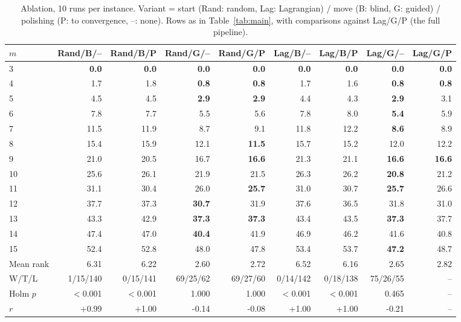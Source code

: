 \begin{table}[t]
\centering
\footnotesize
\setlength{\tabcolsep}{3pt}
\caption{Ablation, 10 runs per instance. Variant = start (Rand: random, Lag: Lagrangian) / move (B: blind, G: guided) / polishing (P: to convergence, --: none). Rows as in Table~\ref{tab:main}, with comparisons against Lag/G/P (the full pipeline).}\label{tab:ablation}
\begin{tabular}{lrrrrrrrr}
\toprule
$m$ & Rand/B/-- & Rand/B/P & Rand/G/-- & Rand/G/P & Lag/B/-- & Lag/B/P & Lag/G/-- & Lag/G/P \\
\midrule
3 & \textbf{0.0} & \textbf{0.0} & \textbf{0.0} & \textbf{0.0} & \textbf{0.0} & \textbf{0.0} & \textbf{0.0} & \textbf{0.0} \\
4 & 1.7 & 1.8 & \textbf{0.8} & \textbf{0.8} & 1.7 & 1.6 & \textbf{0.8} & \textbf{0.8} \\
5 & 4.5 & 4.5 & \textbf{2.9} & \textbf{2.9} & 4.4 & 4.3 & \textbf{2.9} & 3.1 \\
6 & 7.8 & 7.7 & 5.5 & 5.6 & 7.8 & 8.0 & \textbf{5.4} & 5.9 \\
7 & 11.5 & 11.9 & 8.7 & 9.1 & 11.8 & 12.2 & \textbf{8.6} & 8.9 \\
8 & 15.4 & 15.9 & 12.1 & \textbf{11.5} & 15.7 & 15.2 & 12.0 & 12.2 \\
9 & 21.0 & 20.5 & 16.7 & \textbf{16.6} & 21.3 & 21.1 & \textbf{16.6} & \textbf{16.6} \\
10 & 25.6 & 26.1 & 21.9 & 21.5 & 26.3 & 26.2 & \textbf{20.8} & 21.2 \\
11 & 31.1 & 30.4 & 26.0 & \textbf{25.7} & 31.0 & 30.7 & \textbf{25.7} & 26.6 \\
12 & 37.7 & 37.3 & \textbf{30.7} & 31.9 & 37.6 & 36.5 & 31.8 & 31.0 \\
13 & 43.3 & 42.9 & \textbf{37.3} & \textbf{37.3} & 43.4 & 43.5 & \textbf{37.3} & 37.7 \\
14 & 47.4 & 47.0 & \textbf{40.4} & 41.9 & 46.9 & 46.2 & 41.6 & 40.8 \\
15 & 52.4 & 52.8 & 48.0 & 47.8 & 53.4 & 53.7 & \textbf{47.2} & 48.7 \\
\midrule
Mean rank & 6.31 & 6.22 & 2.60 & 2.72 & 6.52 & 6.16 & 2.65 & 2.82 \\
W/T/L & 1/15/140 & 0/15/141 & 69/25/62 & 69/27/60 & 0/14/142 & 0/18/138 & 75/26/55 & -- \\
Holm $p$ & $<$0.001 & $<$0.001 & 1.000 & 1.000 & $<$0.001 & $<$0.001 & 0.465 & -- \\
$r$ & +0.99 & +1.00 & -0.14 & -0.08 & +1.00 & +1.00 & -0.21 & -- \\
\bottomrule
\end{tabular}
\end{table}
